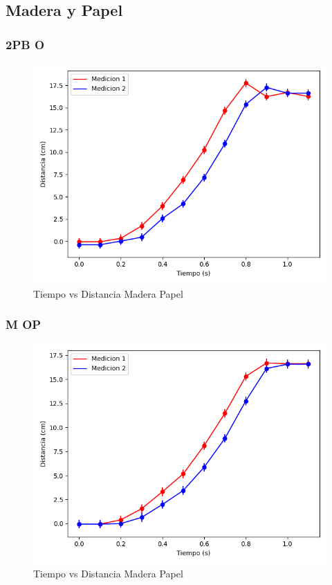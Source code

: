 \documentclass[12pt,a4]{article}
\begin{document}
\subsection{Madera y Papel}

\subsubsection{2PB O}

\begin{figure}[H]
    \centering
    \includegraphics[width=0.9\linewidth]{TiempoVsDistanciaPisoHoja2PB_O.png}
    \caption{Tiempo vs Distancia Madera Papel}
    \label{fig:TvD2PB_O piso hoja}
\end{figure}

\subsubsection{M OP}

\begin{figure}[H]
    \centering
    \includegraphics[width=0.9\linewidth]{TiempoVsDistanciaPisoHojaM_OP.png}
    \caption{Tiempo vs Distancia Madera Papel}
    \label{fig:TvDM_OP piso hoja}
\end{figure}
\end{document}
